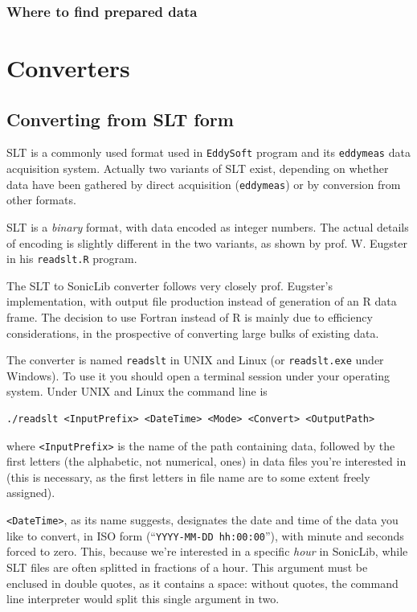 \documentclass[a4paper,10pt]{book}
\begin{document}
\subsection{Where to find prepared data}


\chapter{Converters}
\label{chap:Converters}

\section{Converting from SLT form}
\label{sec:Convert SLT}

SLT is a commonly used format used in \verb|EddySoft| program and its \verb|eddymeas| data acquisition system. Actually two variants of SLT exist, depending on whether data have been gathered by direct acquisition (\verb|eddymeas|) or by conversion from other formats.

SLT is a \emph{binary} format, with data encoded as integer numbers. The actual details of encoding is slightly different in the two variants, as shown by prof. W. Eugster in his \verb|readslt.R| program.

The SLT to SonicLib converter follows very closely prof. Eugster's implementation, with output file production instead of generation of an R data frame. The decision to use Fortran instead of R is mainly due to efficiency considerations, in the prospective of converting large bulks of existing data.

The converter is named \verb|readslt| in UNIX and Linux (or \verb|readslt.exe| under Windows). To use it you should open a terminal session under your operating system. Under UNIX and Linux the command line is

\begin{verbatim}
./readslt <InputPrefix> <DateTime> <Mode> <Convert> <OutputPath>
\end{verbatim}

\noindent where \verb|<InputPrefix>| is the name of the path containing data, followed by the first letters (the alphabetic, not numerical, ones) in data files you're interested in (this is necessary, as the first letters in file name are to some extent freely assigned).

\verb|<DateTime>|, as its name suggests, designates the date and time of the data you like to convert, in ISO form (``\verb|YYYY-MM-DD hh:00:00|''), with minute and seconds forced to zero. This, because we're interested in a specific \emph{hour} in SonicLib, while SLT files are often splitted in fractions of a hour. This argument must be enclused in double quotes, as it contains a space: without quotes, the command line interpreter would split this single argument in two.
\end{document}
